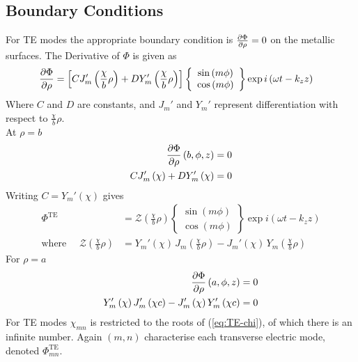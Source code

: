 \documentclass[twoside, a4paper]{article}
\begin{document}
\subsection{Boundary Conditions}
For TE modes the appropriate boundary condition is $\frac{\partial \Phi}{\partial \rho} = 0$ on the metallic surfaces. The Derivative of $\Phi$ is given as
\begin{align*}
\frac{\partial \Phi}{\partial \rho} & = 
\left[
C J_m' \left( \frac{\chi}{b}  \rho \right) +
D Y_m' \left( \frac{\chi}{b}  \rho \right)
\right]
\left\{
\begin{array}{c}
\sin \left( m \phi \right) \\
\cos \left( m \phi \right)
\end{array}
\right\}
\exp i \left( \omega t -k_z z \right)
\end{align*}
Where $C$ and $D$ are constants, and $J_m'$ and $Y_m'$ represent differentiation with respect to $\frac{\chi}{b}\rho$. \\
At $\rho = b$ 
\begin{align*}
\frac{\partial \Phi}{\partial \rho}\left( b,\phi,z \right) & = 0 \\
C J_m' \left( \chi \right) +
D Y_m' \left( \chi \right) & = 0 \\
\end{align*}
Writing $C = Y_m' \left( \chi \right) $ gives
\begin{align}
\label{eq:TE-Phi}
\Phi^{\text{TE}} & = 
	\mathcal{Z} \left( \frac{\chi}{b} \rho \right)
	\left\{
	\begin{array}{c}
		\sin \left( m \phi \right) \\
		\cos \left( m \phi \right)
	\end{array}
	\right\}
	\exp i \left( \omega t - k_z z \right) \\
\label{eq:TE-Z}
\text{where } \quad 
\mathcal{Z} \left( \frac{\chi}{b} \rho \right) & =
	Y_m' \left( \chi \right) \, J_m \left( \frac{ \chi}{b} \rho \right) - 
	J_m' \left( \chi \right) \, Y_m \left( \frac{ \chi }{b} \rho \right)
\end{align}
For $\rho = a$
\begin{align}
\frac{\partial \Phi}{\partial \rho}\left( a,\phi,z \right) & = 0 
\nonumber \\
\label{eq:TE-chi}
Y_m' \left( \chi \right) J_m' \left( \chi c \right) -
J_m' \left( \chi \right) Y_m' \left( \chi c \right) & = 0
\end{align}
For TE modes $\chi_{mn}$ is restricted to the roots of (\ref{eq:TE-chi}), of which there is an infinite number. Again $(m,n)$ characterise each transverse electric mode, denoted $\Phi_{mn}^{\text{TE}}$.
\end{document}
